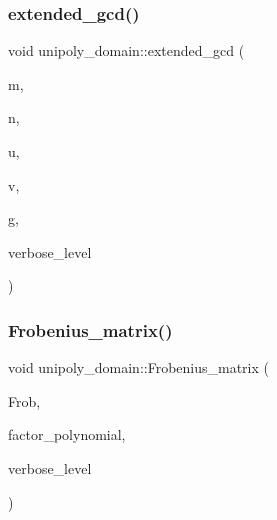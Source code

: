 \subsubsection{\texorpdfstring{extended\+\_\+gcd()}{extended\_gcd()}}
{\footnotesize\ttfamily void unipoly\+\_\+domain\+::extended\+\_\+gcd (\begin{DoxyParamCaption}\item[{\mbox{\hyperlink{galois_8h_a77ca58de3d2da6172242493dd9c8aaa8}{unipoly\+\_\+object}}}]{m,  }\item[{\mbox{\hyperlink{galois_8h_a77ca58de3d2da6172242493dd9c8aaa8}{unipoly\+\_\+object}}}]{n,  }\item[{\mbox{\hyperlink{galois_8h_a77ca58de3d2da6172242493dd9c8aaa8}{unipoly\+\_\+object}} \&}]{u,  }\item[{\mbox{\hyperlink{galois_8h_a77ca58de3d2da6172242493dd9c8aaa8}{unipoly\+\_\+object}} \&}]{v,  }\item[{\mbox{\hyperlink{galois_8h_a77ca58de3d2da6172242493dd9c8aaa8}{unipoly\+\_\+object}} \&}]{g,  }\item[{\mbox{\hyperlink{galois_8h_a09fddde158a3a20bd2dcadb609de11dc}{I\+NT}}}]{verbose\+\_\+level }\end{DoxyParamCaption})}

\mbox{\label{classunipoly__domain_a861279fd941d6bad64e6ec13279453af}} 
\subsubsection{\texorpdfstring{Frobenius\+\_\+matrix()}{Frobenius\_matrix()}}
{\footnotesize\ttfamily void unipoly\+\_\+domain\+::\+Frobenius\+\_\+matrix (\begin{DoxyParamCaption}\item[{\mbox{\hyperlink{galois_8h_a09fddde158a3a20bd2dcadb609de11dc}{I\+NT}} $\ast$\&}]{Frob,  }\item[{\mbox{\hyperlink{galois_8h_a77ca58de3d2da6172242493dd9c8aaa8}{unipoly\+\_\+object}}}]{factor\+\_\+polynomial,  }\item[{\mbox{\hyperlink{galois_8h_a09fddde158a3a20bd2dcadb609de11dc}{I\+NT}}}]{verbose\+\_\+level }\end{DoxyParamCaption})}

\mbox{\label{classunipoly__domain_ab760666b374f5052a2985a2b549c4754}} 
